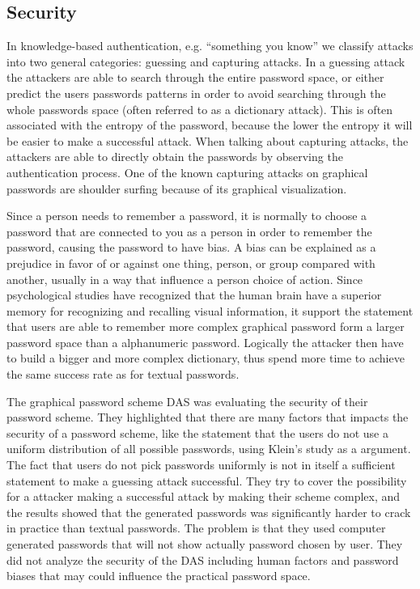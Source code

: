     
\subsection{Security}

  In knowledge-based authentication, e.g. ``something you know'' we classify attacks into two general categories: guessing and capturing attacks. In a guessing attack the attackers are able to search through the entire password space, or either predict the users passwords patterns in order to avoid searching through the whole passwords space (often referred to as a dictionary attack). This is often associated with the entropy of the password, because the lower the entropy it will be easier to make a successful attack. When talking about capturing attacks, the attackers are able to directly obtain the passwords by observing the authentication process. One of the known capturing attacks on graphical passwords are shoulder surfing because of its graphical visualization.  

  Since a person needs to remember a password, it is normally to choose a password that are connected to you as a person in order to remember the password, causing the password to have bias. A bias can be explained as a prejudice in favor of or against one thing, person, or group compared with another, usually in a way that influence a person choice of action. Since psychological studies have recognized that the human brain have a superior memory for recognizing and recalling visual information, it support the statement that users are able to remember more complex graphical password form a larger password space than a alphanumeric password. Logically the attacker then have to build a bigger and more complex dictionary, thus spend more time to achieve the same success rate as for textual passwords. 

  The graphical password scheme DAS \cite{Jermyn} was evaluating the security of their password scheme. They highlighted that there are many factors that impacts the security of a password scheme, like the statement that the users do not use a uniform distribution of all possible passwords, using Klein's study \cite{UnixPasswords} as a argument. The fact that users do not pick passwords uniformly is not in itself a sufficient statement to make a guessing attack successful. They try to cover the possibility for a attacker making a successful attack by making their scheme complex, and the results showed that the generated passwords was significantly harder to crack in practice than textual passwords. The problem is that they used computer generated passwords that will not show actually password chosen by user. They did not analyze the security of the DAS including human factors and password biases that may could influence the practical password space. 

